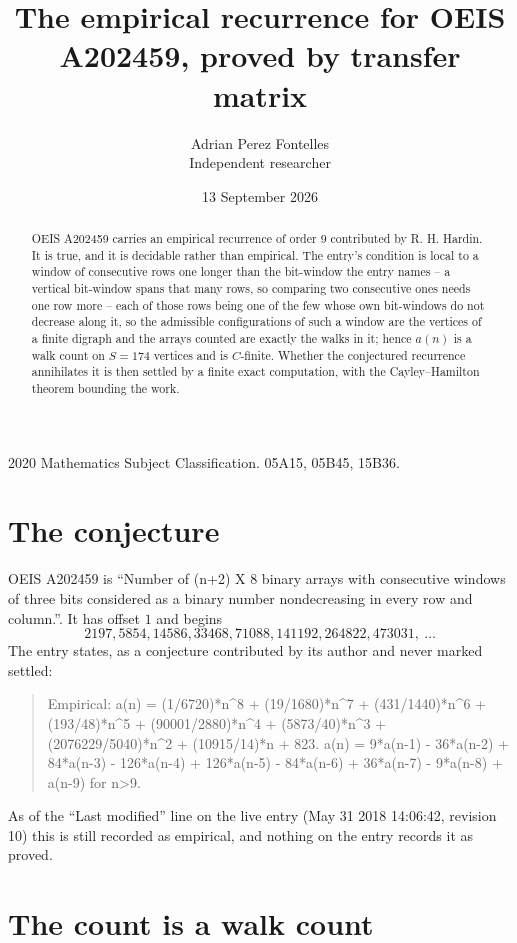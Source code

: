 \documentclass[11pt,a4paper]{article}
\title{The empirical recurrence for OEIS A202459, proved by transfer matrix}
\author{Adrian Perez Fontelles\\ \small Independent researcher}
\date{13 September 2026}
\theoremstyle{plain}
\theoremstyle{definition}
\begin{document}
\maketitle

\begin{abstract}
OEIS A202459 carries an empirical recurrence of order $9$ contributed by R. H. Hardin. It is
true, and it is decidable rather than empirical. The entry's condition is local to a window of consecutive rows one longer than the bit-window the entry names -- a vertical bit-window spans that many rows, so comparing two consecutive ones needs one row more -- each of those rows being one of the few whose own bit-windows do not decrease along it, so
the admissible configurations of such a window are the vertices of a finite digraph and the
arrays counted are exactly the walks in it; hence $a(n)$ is a walk count on $S=174$ vertices
and is $C$-finite. Whether the conjectured recurrence annihilates it is then settled by a
finite exact computation, with the Cayley--Hamilton theorem bounding the work.
\end{abstract}

\noindent\small 2020 Mathematics Subject Classification. 05A15, 05B45, 15B36.\normalsize

\section{The conjecture}

OEIS A202459 is ``Number of (n+2) X 8 binary arrays with consecutive windows of three bits considered as a binary number nondecreasing in every row and column.''. It has offset $1$ and begins
\[
2197, 5854, 14586, 33468, 71088, 141192, 264822, 473031,\ \dots
\]
The entry states, as a conjecture contributed by its author and never marked settled:
\begin{quote}
Empirical: a(n) = (1/6720)*n\^{}8 + (19/1680)*n\^{}7 + (431/1440)*n\^{}6 + (193/48)*n\^{}5 + (90001/2880)*n\^{}4 + (5873/40)*n\^{}3 + (2076229/5040)*n\^{}2 + (10915/14)*n + 823. a(n) = 9*a(n-1) - 36*a(n-2) + 84*a(n-3) - 126*a(n-4) + 126*a(n-5) - 84*a(n-6) + 36*a(n-7) - 9*a(n-8) + a(n-9) for n>9.
\end{quote}
As of the ``Last modified'' line on the live entry (May 31 2018 14:06:42, revision 10) this is still
recorded as empirical, and nothing on the entry records it as proved.

\section{The count is a walk count}
\end{document}
